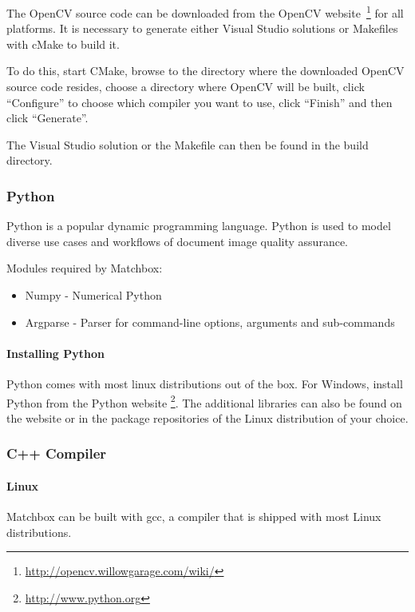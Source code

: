 The OpenCV source code can be downloaded from the OpenCV website~\footnote{\url{http://opencv.willowgarage.com/wiki/}} for all platforms.
It is necessary to generate either Visual Studio solutions or Makefiles with cMake to build it.

To do this, start CMake, browse to the directory where the downloaded OpenCV source code resides, choose a directory where OpenCV will be built, click ``Configure''
to choose which compiler you want to use, click ``Finish'' and then click ``Generate''.

The Visual Studio solution or the Makefile can then be found in the build directory.


\subsubsection{Python}

Python is a popular dynamic programming language. 
Python is used to model diverse use cases and workflows of document image quality assurance.

Modules required by Matchbox:

\begin{itemize}
	\item Numpy - Numerical Python
	\item Argparse - Parser for command-line options, arguments and sub-commands
\end{itemize}


\paragraph{Installing Python}

Python comes with most linux distributions out of the box. For Windows, 
install Python from the Python website \footnote{\url{http://www.python.org}}.
The additional libraries can also be found on the website or in the package repositories 
of the Linux distribution of your choice.



\subsubsection{C++ Compiler}


\paragraph{Linux}

Matchbox can be built with gcc, a compiler 
that is shipped with most Linux distributions.

